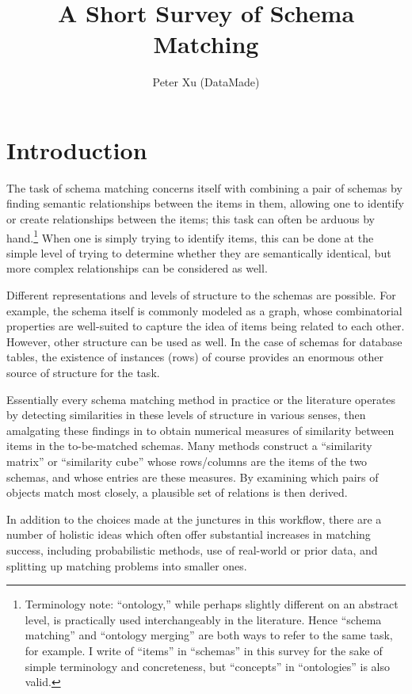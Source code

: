 \documentclass{article}
\title{A Short Survey of Schema Matching}
\author{Peter Xu (DataMade)}
\theoremstyle{definition}
\theoremstyle{remark}
\begin{document}
	\maketitle
	
\section{Introduction}

The task of schema matching concerns itself with combining a pair of schemas by finding semantic relationships between the items in them, allowing one to identify or create relationships between the items; this task can often be arduous by hand.\footnote{Terminology note: ``ontology,'' while perhaps slightly different on an abstract level, is practically used interchangeably in the literature. Hence ``schema matching'' and ``ontology merging'' are both ways to refer to the same task, for example. I write of ``items'' in ``schemas'' in this survey for the sake of simple terminology and concreteness, but ``concepts'' in ``ontologies'' is also valid.} When one is simply trying to identify items, this can be done at the simple level of trying to determine whether they are semantically identical, but more complex relationships can be considered as well. 

Different representations and levels of structure to the schemas are possible. For example, the schema itself is commonly modeled as a graph, whose combinatorial properties are well-suited to capture the idea of items being related to each other. However, other structure can be used as well. In the case of schemas for database tables, the existence of instances (rows) of course provides an enormous other source of structure for the task.

Essentially every schema matching method in practice or the literature operates by detecting similarities in these levels of structure in various senses, then amalgating these findings in to obtain numerical measures of similarity between items in the to-be-matched schemas. Many methods construct a ``similarity matrix'' or ``similarity cube'' whose rows/columns are the items of the two schemas, and whose entries are these measures. By examining which pairs of objects match most closely, a plausible set of relations is then derived.

In addition to the choices made at the junctures in this workflow, there are a number of holistic ideas which often offer substantial increases in matching success, including probabilistic methods, use of real-world or prior data, and splitting up matching problems into smaller ones.
\end{document}

